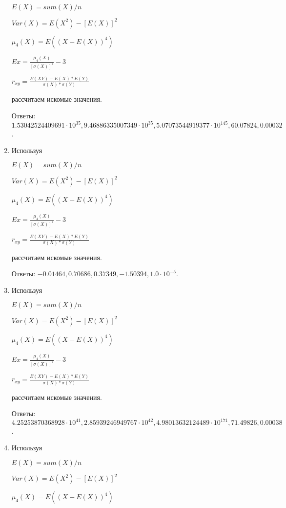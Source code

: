 \documentclass[a4paper,12pt]{article}
\begin{document}
\begin{enumerate}
	$E(X) = sum(X) / n$

	$Var(X) = E(X^2) - [E(X)]^2$

	$\mu_4(X) = E((X-E(X))^4)$

	$Ex = \frac{\mu_4(X)}{[\sigma(X)]^4} - 3$

	$r_{xy} = \frac{E(XY) - E(X) * E(Y)}{\sigma(X) * \sigma(Y)}$

    рассчитаем искомые значения.

    Ответы: $1.53042524409691 \cdot 10^{35}, 9.46886335007349 \cdot 10^{35}, 5.07073544919377 \cdot 10^{145}, 60.07824, 0.00032$.

    


\item

    
    Используя

	$E(X) = sum(X) / n$

	$Var(X) = E(X^2) - [E(X)]^2$

	$\mu_4(X) = E((X-E(X))^4)$

	$Ex = \frac{\mu_4(X)}{[\sigma(X)]^4} - 3$

	$r_{xy} = \frac{E(XY) - E(X) * E(Y)}{\sigma(X) * \sigma(Y)}$

    рассчитаем искомые значения.

    Ответы: $-0.01464, 0.70686, 0.37349, -1.50394, 1.0 \cdot 10^{-5}$.

    


\item

    
    Используя

	$E(X) = sum(X) / n$

	$Var(X) = E(X^2) - [E(X)]^2$

	$\mu_4(X) = E((X-E(X))^4)$

	$Ex = \frac{\mu_4(X)}{[\sigma(X)]^4} - 3$

	$r_{xy} = \frac{E(XY) - E(X) * E(Y)}{\sigma(X) * \sigma(Y)}$

    рассчитаем искомые значения.

    Ответы: $4.25253870368928 \cdot 10^{41}, 2.85939246949767 \cdot 10^{42}, 4.98013632124489 \cdot 10^{171}, 71.49826, 0.00038$.

    


\item

    
    Используя

	$E(X) = sum(X) / n$

	$Var(X) = E(X^2) - [E(X)]^2$

	$\mu_4(X) = E((X-E(X))^4)$


\end{enumerate}
\end{document}
